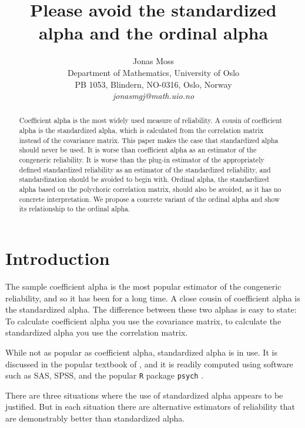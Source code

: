 \documentclass[twoside]{article}
\title{Please avoid the standardized alpha and the ordinal alpha}
\author{
  Jonas Moss \orcid{0000-0002-6876-6964} \\
  Department of Mathematics, University of Oslo\\
  PB 1053, Blindern, NO-0316, Oslo, Norway \\
  \it{jonasmgj@math.uio.no}
}
\begin{document}
\maketitle

\begin{abstract}
Coefficient alpha is the most widely used measure of reliability. A cousin of coefficient alpha is the standardized alpha, which is calculated from the correlation matrix instead of the covariance matrix. This paper makes the case that standardized alpha should never be used. It is worse than coefficient alpha as an estimator of the congeneric reliability. It is worse than the plug-in estimator of the appropriately defined standardized reliability as an estimator of the standardized reliability, and standardization should be avoided to begin with. Ordinal alpha, the standardized alpha based on the polychoric correlation matrix, should also be avoided, as it has no concrete interpretation. We propose a concrete variant of the ordinal alpha and show its relationship to the ordinal alpha.
\end{abstract}


\section{Introduction}

The sample coefficient alpha is the most popular estimator of the congeneric reliability, and so it has been for a long time. A close cousin of coefficient alpha is the standardized alpha. The difference between these two alphas is easy to state: To calculate coefficient alpha you use the covariance matrix, to calculate the standardized alpha you use the correlation matrix. 

While not as popular as coefficient alpha, standardized alpha is in use. It is discussed in the popular textbook of \citet[pp. 139--141]{Furr2013-yu}, and it is readily computed using software such as SAS, SPSS, and the popular \texttt{R} \citep{Team2013-tt} package \texttt{psych} \citep{psych}. 

There are three situations where the use of standardized alpha appears to be justified. But in each situation there are alternative estimators of reliability that are demonstrably better than standardized alpha. 
\end{document}
